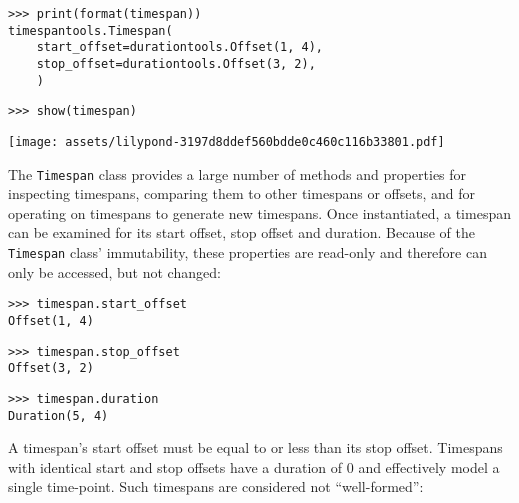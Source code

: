 \begin{singlespacing}
\vspace{-0.5\baselineskip}
\begin{lstlisting}
>>> print(format(timespan))
timespantools.Timespan(
    start_offset=durationtools.Offset(1, 4),
    stop_offset=durationtools.Offset(3, 2),
    )
\end{lstlisting}
\begin{lstlisting}
>>> show(timespan)
\end{lstlisting}
\noindent\texttt{[image: assets/lilypond-3197d8ddef560bdde0c460c116b33801.pdf]}
\end{singlespacing}

\noindent The \texttt{Timespan} class provides a large number of methods and
properties for inspecting timespans, comparing them to other timespans or
offsets, and for operating on timespans to generate new timespans. Once
instantiated, a timespan can be examined for its start offset, stop offset
and duration. Because of the \texttt{Timespan} class' immutability, these
properties are read-only and therefore can only be accessed, but not changed:

\begin{comment}
<abjad>
timespan.start_offset
timespan.stop_offset
timespan.duration
</abjad>
\end{comment}

\begin{singlespacing}
\vspace{-0.5\baselineskip}
\begin{lstlisting}
>>> timespan.start_offset
Offset(1, 4)
\end{lstlisting}
\begin{lstlisting}
>>> timespan.stop_offset
Offset(3, 2)
\end{lstlisting}
\begin{lstlisting}
>>> timespan.duration
Duration(5, 4)
\end{lstlisting}
\end{singlespacing}

\noindent A timespan's start offset must be equal to or less than its stop
offset. Timespans with identical start and stop offsets have a duration of 0
and effectively model a single time-point. Such timespans are considered not
\enquote{well-formed}:

\begin{comment}
<abjad>
timepoint_timespan = timespantools.Timespan(1, 1)
timepoint_timespan.duration
timepoint_timespan.is_well_formed
</abjad>
\end{comment}

